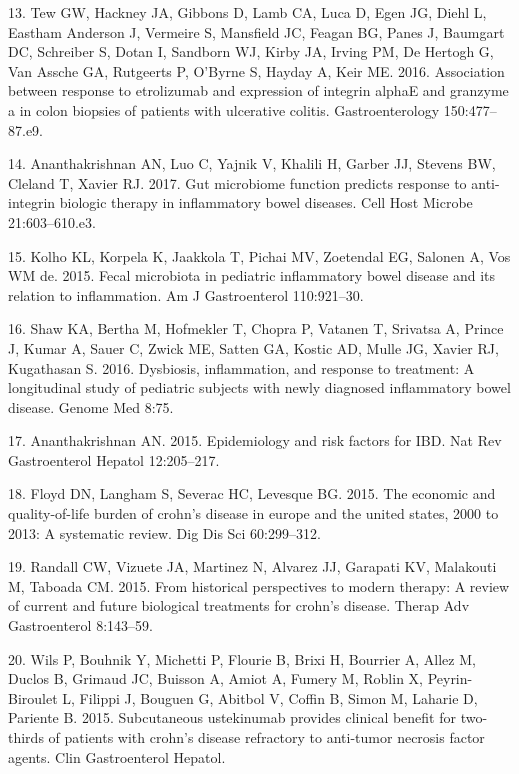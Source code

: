 \documentclass[12pt,]{article}
\begin{document}
\hypertarget{ref-Tew2016_UC}{}
13. Tew GW, Hackney JA, Gibbons D, Lamb CA, Luca D, Egen JG, Diehl L,
Eastham Anderson J, Vermeire S, Mansfield JC, Feagan BG, Panes J,
Baumgart DC, Schreiber S, Dotan I, Sandborn WJ, Kirby JA, Irving PM, De
Hertogh G, Van Assche GA, Rutgeerts P, O'Byrne S, Hayday A, Keir ME.
2016. Association between response to etrolizumab and expression of
integrin alphaE and granzyme a in colon biopsies of patients with
ulcerative colitis. Gastroenterology 150:477--87.e9.

\hypertarget{ref-Ananthakrishnan_IBD_2017}{}
14. Ananthakrishnan AN, Luo C, Yajnik V, Khalili H, Garber JJ, Stevens
BW, Cleland T, Xavier RJ. 2017. Gut microbiome function predicts
response to anti-integrin biologic therapy in inflammatory bowel
diseases. Cell Host Microbe 21:603--610.e3.

\hypertarget{ref-Kolho2015_pedIBD}{}
15. Kolho KL, Korpela K, Jaakkola T, Pichai MV, Zoetendal EG, Salonen A,
Vos WM de. 2015. Fecal microbiota in pediatric inflammatory bowel
disease and its relation to inflammation. Am J Gastroenterol
110:921--30.

\hypertarget{ref-Shaw_response_2016}{}
16. Shaw KA, Bertha M, Hofmekler T, Chopra P, Vatanen T, Srivatsa A,
Prince J, Kumar A, Sauer C, Zwick ME, Satten GA, Kostic AD, Mulle JG,
Xavier RJ, Kugathasan S. 2016. Dysbiosis, inflammation, and response to
treatment: A longitudinal study of pediatric subjects with newly
diagnosed inflammatory bowel disease. Genome Med 8:75.

\hypertarget{ref-ananthakrishnan_epidemiology_2015}{}
17. Ananthakrishnan AN. 2015. Epidemiology and risk factors for IBD. Nat
Rev Gastroenterol Hepatol 12:205--217.

\hypertarget{ref-floyd_economicburden_2015}{}
18. Floyd DN, Langham S, Severac HC, Levesque BG. 2015. The economic and
quality-of-life burden of crohn's disease in europe and the united
states, 2000 to 2013: A systematic review. Dig Dis Sci 60:299--312.

\hypertarget{ref-randall_CDbiologics_2015}{}
19. Randall CW, Vizuete JA, Martinez N, Alvarez JJ, Garapati KV,
Malakouti M, Taboada CM. 2015. From historical perspectives to modern
therapy: A review of current and future biological treatments for
crohn's disease. Therap Adv Gastroenterol 8:143--59.

\hypertarget{ref-wils_ust_2015}{}
20. Wils P, Bouhnik Y, Michetti P, Flourie B, Brixi H, Bourrier A, Allez
M, Duclos B, Grimaud JC, Buisson A, Amiot A, Fumery M, Roblin X,
Peyrin-Biroulet L, Filippi J, Bouguen G, Abitbol V, Coffin B, Simon M,
Laharie D, Pariente B. 2015. Subcutaneous ustekinumab provides clinical
benefit for two-thirds of patients with crohn's disease refractory to
anti-tumor necrosis factor agents. Clin Gastroenterol Hepatol.
\end{document}
